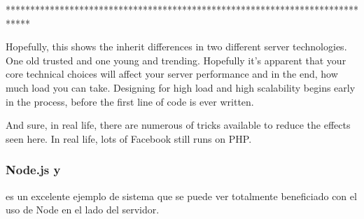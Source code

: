 %
%


*****************************************************************************


Hopefully, this shows the inherit differences in two different server technologies. One old trusted and one young and trending. Hopefully it’s apparent that your core technical choices will affect your server performance and in the end, how much load you can take. Designing for high load and high scalability begins early in the process, before the first line of code is ever written.

And sure, in real life, there are numerous of tricks available to reduce the effects seen here. In real life, lots of Facebook still runs on PHP.


\subsubsection{Node.js y \ecommerce}

\ecommerce es un excelente ejemplo de sistema que se puede ver totalmente beneficiado con el uso de Node en el lado del servidor. 

